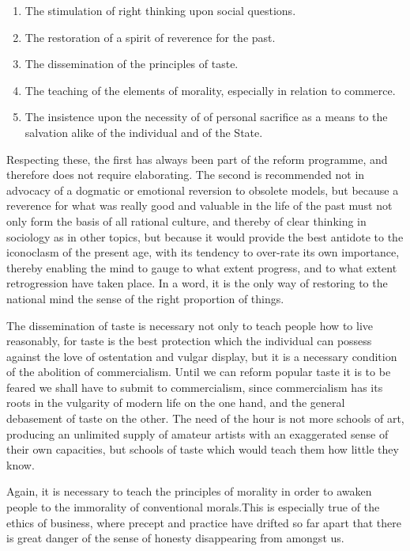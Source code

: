 \documentclass{book}
\begin{document}
\begin{enumerate}
	\item The stimulation of right thinking upon social questions.


	\item The restoration of a spirit of reverence for the past.


	\item The dissemination of the principles of taste.


	\item The teaching of the elements of morality, especially in relation to commerce.


	\item The insistence upon the necessity of of personal sacrifice as a means to the salvation alike of the individual and of the State.



\end{enumerate}
Respecting these, the first has always been part of the reform programme, and therefore does not require elaborating. The second is recommended not in advocacy of a dogmatic or emotional reversion to obsolete models, but because a reverence for what was really good and valuable in the life of the past must not only form the basis of all rational culture, and thereby of clear thinking in sociology as in other topics, but because it would provide the best antidote to the iconoclasm of the present age, with its tendency to over-rate its own importance, thereby enabling the mind to gauge to what extent progress, and to what extent retrogression have taken place. In a word, it is the only way of restoring to the national mind the sense of the right proportion of things.

The dissemination of taste is necessary not only to teach people how to live reasonably, for taste is the best protection which the individual can possess against the love of ostentation and vulgar display, but it is a necessary condition of the abolition of commercialism. Until we can reform popular taste it is to be feared we shall have to submit to commercialism, since commercialism has its roots in the vulgarity of modern life on the one hand, and the general debasement of taste on the other. The need of the hour is not more schools of art, producing an unlimited supply of amateur artists with an exaggerated sense of their own capacities, but schools of taste which would teach them how little they know.

Again, it is necessary to teach the principles of morality in order to awaken people to the immorality of conventional morals.\footnotemark[1] This is especially true of the ethics of business, where precept and practice have drifted so far apart that there is great danger of the sense of honesty disappearing from amongst us.
\end{document}
